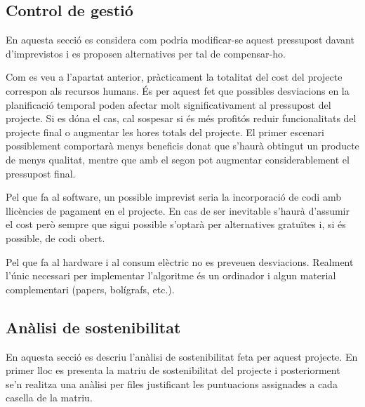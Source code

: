 \documentclass[10pt,a4paper]{article}
\begin{document}
\subsection{Control de gestió}
\label{control}

En aquesta secció es considera com podria modificar-se aquest pressupost davant d'imprevistos i es proposen alternatives per tal de compensar-ho.

Com es veu a l'apartat anterior, pràcticament la totalitat del cost del projecte correspon als recursos humans. És per aquest fet que possibles desviacions en la planificació temporal poden afectar molt significativament al pressupost del projecte. Si es dóna el cas, cal sospesar si és més profitós reduir funcionalitats del projecte final o augmentar les hores totals del projecte. El primer escenari possiblement comportarà menys beneficis donat que s'haurà obtingut un producte de menys qualitat, mentre que amb el segon pot augmentar considerablement el pressupost final.

Pel que fa al software, un possible imprevist seria la incorporació de codi amb llicències de pagament en el projecte. En cas de ser inevitable s'haurà d'assumir el cost però sempre que sigui possible s'optarà per alternatives gratuïtes i, si és possible, de codi obert.

Pel que fa al hardware i al consum elèctric no es preveuen desviacions. Realment l'únic necessari per implementar l'algoritme és un ordinador i algun material complementari (papers, bolígrafs, etc.).

\subsection{Anàlisi de sostenibilitat}

En aquesta secció es descriu l'anàlisi de sostenibilitat feta per aquest projecte. En primer lloc es presenta la matriu de sostenibilitat del projecte i posteriorment se'n realitza una anàlisi per files justificant les puntuacions assignades a cada casella de la matriu.
\end{document}
